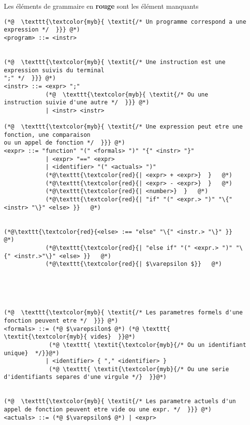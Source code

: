 \documentclass{report}
\begin{document}
\begin{paracol}{2}
        \footnotesize







\begin{note}{}{}
    Les éléments de grammaire en \textbf{\textcolor{myr}{rouge}} 
    sont les élément manquants
\end{note}


\begin{adjustbox}{width=0.66\linewidth}
\begin{lstlisting}
(*@  \texttt{\textcolor{myb}{ \textit{/* Un programme correspond a une expression */  }}} @*)
<program> ::= <instr>


(*@  \texttt{\textcolor{myb}{ \textit{/* Une instruction est une expression suivis du terminal 
";" */  }}} @*)
<instr> ::= <expr> ";"
            (*@  \texttt{\textcolor{myb}{ \textit{/* Ou une instruction suivie d'une autre */  }}} @*)
            | <instr> <instr>

(*@  \texttt{\textcolor{myb}{ \textit{/* Une expression peut etre une fonction, une comparaison 
ou un appel de fonction */  }}} @*)
<expr> ::= "function" "(" <formals> ")" "{" <instr> "}"
            | <expr> "==" <expr>
            | <identifier> "(" <actuals> ")"
            (*@\texttt{\textcolor{red}{| <expr> + <expr>}  }   @*)
            (*@\texttt{\textcolor{red}{| <expr> - <expr>}  }   @*)
            (*@\texttt{\textcolor{red}{| <number>}  }   @*)
            (*@\texttt{\textcolor{red}{| "if" "(" <expr.> ")" "\{" <instr> "\}" <else> }}   @*)


(*@\texttt{\textcolor{red}{<else> :== "else" "\{" <instr.> "\}" }}   @*)
            (*@\texttt{\textcolor{red}{| "else if" "(" <expr.> ")" "\{" <instr.>"\}" <else> }}   @*)
            (*@\texttt{\textcolor{red}{| $\varepsilon $}}   @*)


            


(*@  \texttt{\textcolor{myb}{ \textit{/* Les parametres formels d'une fonction peuvent etre */  }}} @*)
<formals> ::= (*@ $\varepsilon$ @*) (*@ \texttt{ \textit{\textcolor{myb}{ vides}  }}@*)
             (*@ \texttt{ \textit{\textcolor{myb}{/* Ou un identifiant unique}  */}}@*) 
            | <identifier> { "," <identifier> }
             (*@ \texttt{ \textit{\textcolor{myb}{/* Ou une serie d'identifiants separes d'une virgule */}  }}@*)
            

(*@  \texttt{\textcolor{myb}{ \textit{/* Les parametre actuels d'un appel de fonction peuvent etre vide ou une expr. */  }}} @*)
<actuals> ::= (*@ $\varepsilon$ @*) | <expr>



\end{lstlisting}
\end{adjustbox}
\end{paracol}
\end{document}
